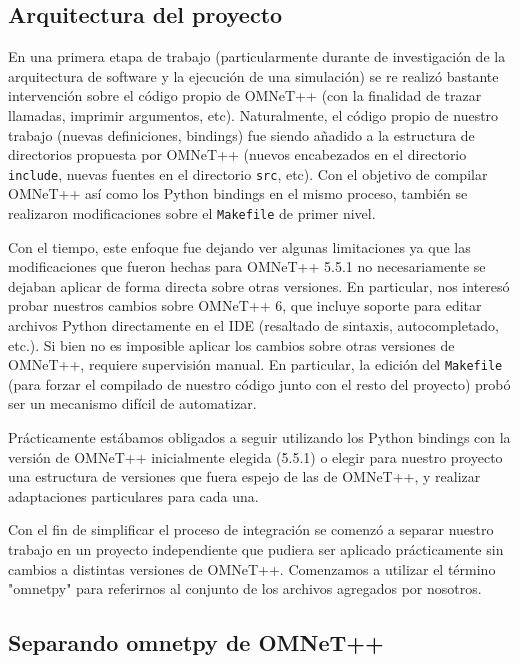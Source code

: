 \documentclass[]{article}
\begin{document}
\subsection{Arquitectura del proyecto}

En una primera etapa de trabajo (particularmente durante de investigación de la
arquitectura de software y la ejecución de una simulación) se re realizó
bastante intervención sobre el código propio de OMNeT++ (con la finalidad de
trazar llamadas, imprimir argumentos, etc). Naturalmente, el código propio de
nuestro trabajo (nuevas definiciones, bindings) fue siendo añadido a la
estructura de directorios propuesta por OMNeT++ (nuevos encabezados en el
directorio \verb!include!, nuevas fuentes en el directorio \verb!src!, etc).
Con el objetivo de compilar OMNeT++ así como los Python bindings en el mismo
proceso, también se realizaron modificaciones sobre el \verb!Makefile! de
primer nivel.

Con el tiempo, este enfoque fue dejando ver algunas limitaciones ya que las
modificaciones que fueron hechas para OMNeT++ 5.5.1 no necesariamente se
dejaban aplicar de forma directa sobre otras versiones. En particular, nos
interesó probar nuestros cambios sobre OMNeT++ 6, que incluye soporte para
editar archivos Python directamente en el IDE (resaltado de sintaxis,
autocompletado, etc.). Si bien no es imposible aplicar los cambios sobre otras
versiones de OMNeT++, requiere supervisión manual. En particular, la edición
del \verb!Makefile! (para forzar el compilado de nuestro código junto con el
resto del proyecto) probó ser un mecanismo difícil de automatizar.

Prácticamente estábamos obligados a seguir utilizando los Python bindings con
la versión de OMNeT++ inicialmente elegida (5.5.1) o elegir para nuestro
proyecto una estructura de versiones que fuera espejo de las de OMNeT++, y
realizar adaptaciones particulares para cada una.

Con el fin de simplificar el proceso de integración se comenzó a separar
nuestro trabajo en un proyecto independiente que pudiera ser aplicado
prácticamente sin cambios a distintas versiones de OMNeT++. Comenzamos a
utilizar el término "omnetpy" para referirnos al conjunto de los archivos
agregados por nosotros.

\subsection{Separando omnetpy de OMNeT++}
\end{document}
